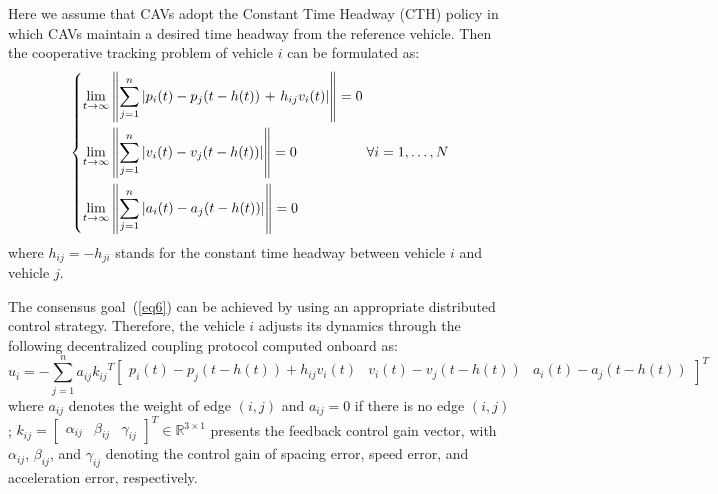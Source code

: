 \documentclass[a4paper]{cas-sc}
\begin{document}
Here we assume that CAVs adopt the Constant Time Headway (CTH) policy in which CAVs maintain a desired time headway from the reference vehicle. Then the cooperative tracking problem of vehicle $i$ can be formulated as:
\begin{equation}
  \left\{ \begin{gathered}
    \mathop {\lim }\limits_{t \to \infty } \left\| {\sum\limits_{j = 1}^n {\left| {{p_i}(t) - {p_j}(t - h(t)){\text{ + }}{h_{ij}}{v_i}(t)} \right|} } \right\| = 0 \hfill \\
    \mathop {\lim }\limits_{t \to \infty } \left\| {\sum\limits_{j = 1}^n {\left| {{v_i}(t) - {v_j}(t - h(t))} \right|} } \right\| = 0 \hfill \\
    \mathop {\lim }\limits_{t \to \infty } \left\| {\sum\limits_{j = 1}^n {\left| {{a_i}(t) - {a_j}(t - h(t))} \right|} } \right\| = 0 \hfill \\
  \end{gathered}  \right.\forall i = 1, \ldots ,N
  \label{eq6}
\end{equation}
where $ {h_{ij}} =  - {h_{ji}} $ stands for the constant time headway between vehicle $i$ and vehicle $j$.

The consensus goal~(\ref{eq6}) can be achieved by using an appropriate distributed control strategy. Therefore, the vehicle $i$ adjusts its dynamics through the following decentralized coupling protocol computed onboard as:
\begin{equation}
  {u_i} =  - \sum\limits_{j = 1}^n {{a_{ij}}{k_{ij}}^T{{\left[ {\begin{array}{*{20}{c}}
              {{p_i}\left( t \right) - {p_j}\left( {t - h(t)} \right) + {h_{ij}}{v_i}\left( t \right)} & {{v_i}\left( t \right) - {v_j}\left( {t - h(t)} \right)} & {{a_i}\left( t \right) - {a_j}\left( {t - h(t)} \right)}
            \end{array}} \right]}^T}}
  \label{eq7}
\end{equation}
where $ {a_{ij}} $ denotes the weight of edge $ \left( {i,j} \right) $ and $ {a_{ij}} = 0 $ if there is no edge $ \left( {i,j} \right) $; $ {k_{ij}} = {\left[ {\begin{array}{*{20}{c}}
          {{\alpha _{ij}}} & {{\beta _{ij}}} & {{\gamma _{ij}}}
        \end{array}} \right]^T} \in {\mathbb{R}^{3 \times 1}} $ presents the feedback control gain vector, with $ {\alpha _{ij}} $, $ {\beta _{ij}} $, and $ {\gamma _{ij}} $ denoting the control gain of spacing error, speed error, and acceleration error, respectively.
\end{document}
